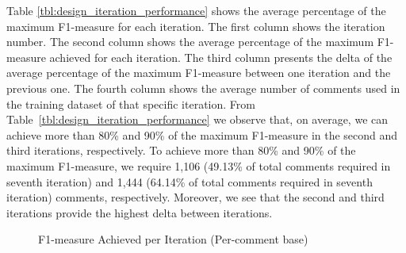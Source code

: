 Table \ref{tbl:design_iteration_performance} shows the average percentage of the maximum F1-measure for each iteration. The first column shows the iteration number. The second column shows the average percentage of the maximum F1-measure achieved for each iteration. The third column presents the delta of the average percentage of the maximum F1-measure between one iteration and the previous one. The fourth column shows the average number of comments used in the training dataset of that specific iteration. From Table~\ref{tbl:design_iteration_performance} we observe that, on average, we can achieve more than 80\% and 90\% of the maximum F1-measure in the second and third iterations, respectively. To achieve more than 80\% and 90\% of the maximum F1-measure, we require 1,106 (49.13\% of total comments required in seventh iteration) and 1,444 (64.14\% of total comments required in seventh iteration) comments, respectively. Moreover, we see that the second and third iterations provide the highest delta between iterations.

\begin{figure}[!thb]
    \centering
    \caption{F1-measure Achieved per Iteration (Per-comment base) }
\end{figure}


